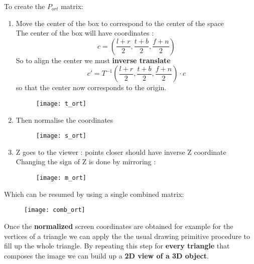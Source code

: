 To create the $P_{ort}$ matrix:
\begin{enumerate}
\item Move the center of the box to correspond to the center of the space\\The center of the box will have coordinates :$$ c = ( \frac{l+r}{2}, \frac{t+b}{2}, \frac{f+n}{2})$$
So to align the center we must \textbf{inverse translate} $$ c' = T^{-1}(\frac{l+r}{2}, \frac{t+b}{2}, \frac{f+n}{2}) \cdot c$$ so that the center now corresponds to the origin. 
\begin{figure}[H]
 \centering
  \texttt{[image: t\_ort]}
\end{figure}
\item Then normalise the coordinates \\
\begin{figure}[H]
 \centering
  \texttt{[image: s\_ort]}
\end{figure}
\item Z goes to the viewer : points closer should have inverse Z coordinate\\
Changing the sign of Z is done by mirroring :
\begin{figure}[H]
 \centering
  \texttt{[image: m\_ort]}
\end{figure}
\end{enumerate}
Which can be resumed by using a single combined matrix:
\begin{figure}[H]
 \centering
  \texttt{[image: comb\_ort]}
\end{figure}
Once the \textbf{normalized} screen coordinates are obtained for example for the vertices of a triangle we can apply the the usual drawing primitive procedure to fill up the whole triangle. By repeating this step for \textbf{every triangle} that composes the image we can build up a \textbf{2D view of a 3D object}.\\

